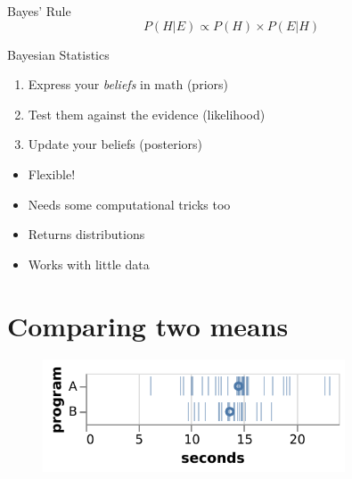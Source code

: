 \documentclass[aspectratio=169,xcolor=svgnames]{beamer}
\begin{document}
\begin{frame}{Bayes' Rule}
  \begin{equation*}
    P(H|E) \propto P(H) \times P(E|H)
  \end{equation*}
\end{frame}

\begin{frame}
  \begin{block}{Bayesian Statistics}
    \begin{enumerate}
    \item Express your \emph{beliefs} in math (priors)
    \item Test them against the evidence (likelihood)
    \item Update your beliefs (posteriors)
    \end{enumerate}
  \end{block}

\end{frame}

\begin{frame}
  \begin{itemize}
  \item Flexible!
  \item Needs some computational tricks too
  \item Returns distributions
  \item Works with little data
  \end{itemize}
\end{frame}

\section{Comparing two means}

\begin{frame}
  \begin{figure}[ht]
    \centering
    \includegraphics[width=0.8\textwidth]{figures/samples_a_b.pdf}
  \end{figure}
\end{frame}
\end{document}
